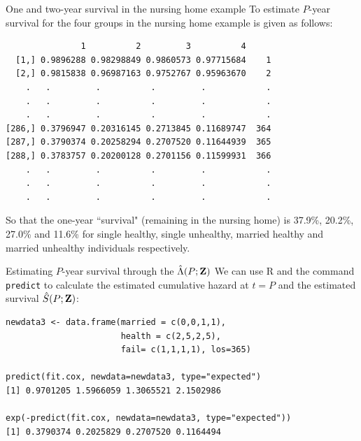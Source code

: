 \documentclass[envcountsect, 10pt, portrait, palatino]{beamer}
\newcommand{\bfZ}{{\mbox{{\bf Z}}}}
\begin{document}
\begin{frame}[fragile]{One and two-year survival in the nursing home example}
To estimate $P$-year survival for the four groups in the nursing home example is given as follows:

\scriptsize
\begin{verbatim}
               1          2         3          4
  [1,] 0.9896288 0.98298849 0.9860573 0.97715684    1
  [2,] 0.9815838 0.96987163 0.9752767 0.95963670    2
    .   .         .          .         .            .
    .   .         .          .         .            .
    .   .         .          .         .            .
[286,] 0.3796947 0.20316145 0.2713845 0.11689747  364
[287,] 0.3790374 0.20258294 0.2707520 0.11644939  365
[288,] 0.3783757 0.20200128 0.2701156 0.11599931  366
    .   .         .          .         .            .
    .   .         .          .         .            .
    .   .         .          .         .            .
\end{verbatim}
\normalsize
So that the one-year ``survival" (remaining in the nursing home) is 37.9\%, 20.2\%, 27.0\% and 11.6\% for single healthy, single unhealthy, married healthy and married unhealthy individuals respectively.
\end{frame}
\begin{frame}[fragile]{Estimating $P$-year survival through the $\hat{\Lambda}(P;\bfZ)$}
We can use R and the command {\tt predict} to calculate the estimated cumulative hazard at $t=P$ and the estimated survival $\hat{S}(P;\bfZ)$:

\small
\begin{verbatim}
newdata3 <- data.frame(married = c(0,0,1,1),
                       health = c(2,5,2,5),
                       fail= c(1,1,1,1), los=365)
                       
predict(fit.cox, newdata=newdata3, type="expected")
[1] 0.9701205 1.5966059 1.3065521 2.1502986

exp(-predict(fit.cox, newdata=newdata3, type="expected"))
[1] 0.3790374 0.2025829 0.2707520 0.1164494
\end{verbatim}
\end{frame}
\end{document}
